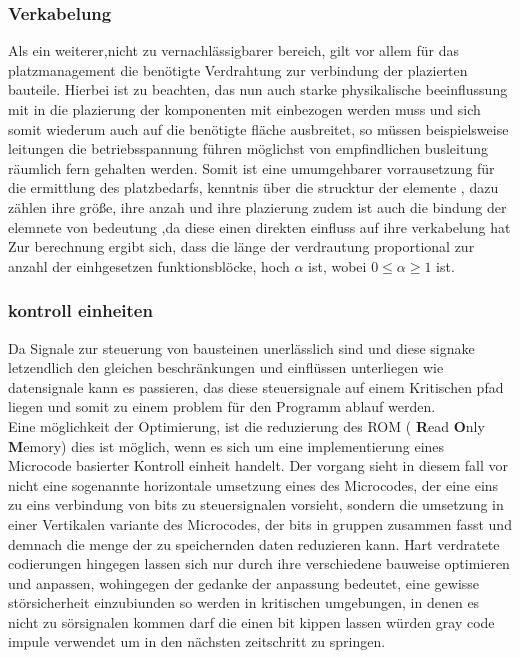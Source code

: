 \documentclass[conference]{IEEEtran}
\begin{document}
 \subsubsection{Verkabelung}
 Als ein weiterer,nicht zu vernachlässigbarer bereich, gilt vor allem für das platzmanagement die benötigte Verdrahtung zur verbindung der plazierten bauteile. Hierbei ist zu beachten, das nun auch starke physikalische beeinflussung mit in die plazierung der komponenten mit einbezogen werden muss und sich somit wiederum auch auf die benötigte fläche ausbreitet, so müssen beispielsweise leitungen die betriebsspannung führen möglichst von empfindlichen busleitung räumlich fern gehalten werden.
Somit ist eine umumgehbarer vorrausetzung für die ermittlung des platzbedarfs, kenntnis über die strucktur der elemente , dazu zählen ihre größe, ihre anzah und ihre plazierung zudem ist auch die bindung der elemnete von bedeutung ,da diese einen direkten einfluss auf ihre verkabelung hat \cite[S.157]{3}
Zur berechnung ergibt sich, dass die länge der verdrautung proportional zur anzahl der einhgesetzen funktionsblöcke, hoch $\alpha$ ist, wobei $0 \leq \alpha \geq 1$ ist.\cite[S.157]{3}\\
 \subsubsection{kontroll einheiten}
 Da Signale zur steuerung von bausteinen unerlässlich sind und diese signake letzendlich den gleichen beschränkungen und einflüssen unterliegen wie datensignale kann es passieren, das diese steuersignale auf einem Kritischen pfad liegen und somit zu einem problem für den Programm ablauf werden.\\
 Eine möglichkeit der Optimierung, ist die reduzierung des ROM ( \textbf{R}ead \textbf{O}nly \textbf{M}emory)
dies ist möglich, wenn es sich um eine implementierung eines Microcode basierter Kontroll einheit handelt. Der vorgang sieht in diesem fall vor nicht eine sogenannte horizontale umsetzung eines des Microcodes, der eine eins zu eins verbindung von bits zu steuersignalen vorsieht, sondern die umsetzung in einer Vertikalen variante des Microcodes, der bits in gruppen zusammen fasst und demnach die menge der zu speichernden daten reduzieren kann.
\cite[S.371-372]{2}
Hart verdratete codierungen hingegen lassen sich nur durch ihre verschiedene bauweise optimieren und anpassen, wohingegen der gedanke der anpassung bedeutet, eine gewisse störsicherheit einzubiunden so werden in kritischen umgebungen, in denen es nicht zu sörsignalen kommen darf die einen bit kippen lassen würden gray code impule verwendet um in den nächsten zeitschritt zu springen.\cite[S.373]{2}
\end{document}
